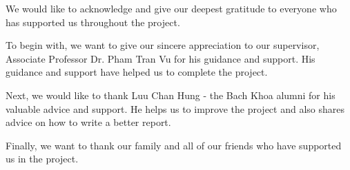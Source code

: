 We would like to acknowledge and give our deepest gratitude to everyone who has supported us throughout the project.

\hfill

To begin with, we want to give our sincere appreciation to our supervisor, Associate Professor Dr. Pham Tran Vu for his guidance and support. His guidance and support have helped us to complete the project.

\hfill

Next, we would like to thank Luu Chan Hung - the Bach Khoa alumni for his valuable advice and support. He helps us to improve the project and also shares advice on how to write a better report. 

\hfill

Finally, we want to thank our family and all of our friends who have supported us in the project.
